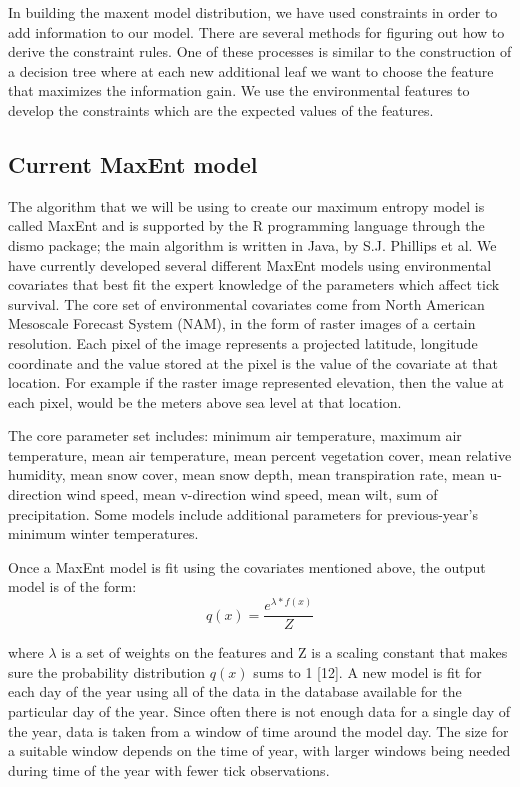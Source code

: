 \noindent In building the maxent model distribution, we have used constraints in order to add information to our model. There are several methods for figuring out how to derive the constraint rules. One of these processes is similar to the construction of a decision tree where at each new additional leaf we want to choose the feature that maximizes the information gain. We use the environmental features to develop the constraints which are the expected values of the features.\newline

\subsection{Current MaxEnt model}

\noindent The algorithm that we will be using to create our maximum entropy model is called MaxEnt and is supported by the R programming language through the dismo package; the main algorithm is written in Java, by S.J. Phillips et al. We have currently developed several different MaxEnt models using environmental covariates that best fit the expert knowledge of the parameters which affect tick survival. The core set of environmental covariates come from North American Mesoscale Forecast System (NAM), in the form of raster images of a certain resolution. Each pixel of the image represents a projected latitude, longitude coordinate and the value stored at the pixel is the value of the covariate at that location. For example if the raster image represented elevation, then the value at each pixel, would be the meters above sea level at that location. \newline

\noindent The core parameter set includes: minimum air temperature, maximum air temperature, mean air temperature, mean percent vegetation cover, mean relative humidity, mean snow cover, mean snow depth, mean transpiration rate, mean u-direction wind speed, mean v-direction wind speed, mean wilt, sum of precipitation. Some models include additional parameters for previous-year's minimum winter temperatures.  

\noindent Once a MaxEnt model is fit using the covariates mentioned above, the output model is of the form:
\begin{equation}
q(x) = \frac{e^{\lambda* f(x)}}{Z}
\end{equation}

\noindent where $\lambda $ is a set of weights on the features and Z is a scaling constant that makes sure the probability distribution $q(x)$ sums to 1 [12]. A new model is fit for each day of the year using all of the data in the database available for the particular day of the year. Since often there is not enough data for a single day of the year, data is taken from a window of time around the model day. The size for a suitable window depends on the time of year, with larger windows being needed during time of the year with fewer tick observations.\newline

